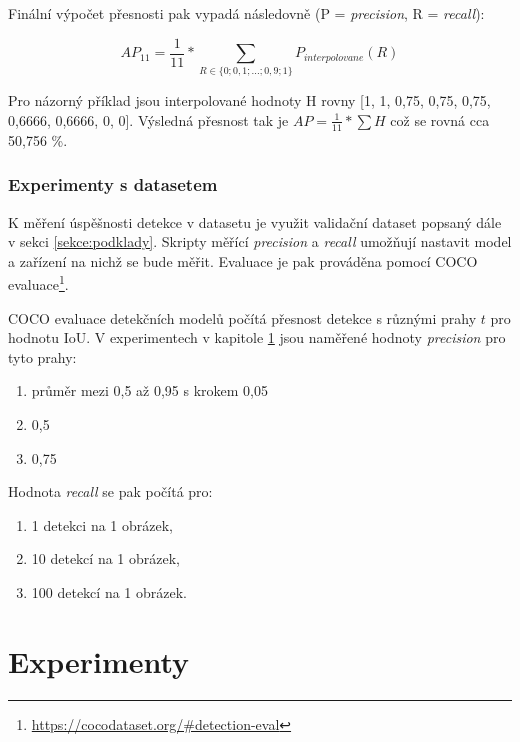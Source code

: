 \noindent Finální výpočet přesnosti pak vypadá následovně \cite{interpolace, detekceMetriky} (P = \emph{precision}, R = \emph{recall}):

\begin{equation}
  AP_{11} = \frac{1}{11} * \sum_{R \in \{0;0,1;...;0,9;1\}} P_{interpolovane} (R)
\end{equation}

Pro názorný příklad jsou interpolované hodnoty H rovny [1, 1, 0,75, 0,75, 0,75, 0,6666, 0,6666, 0, 0]. Výsledná přesnost tak je $AP = \frac{1}{11} * \sum H$ což se rovná cca 50,756 \%.

\subsection*{Experimenty s datasetem}
K měření úspěšnosti detekce v datasetu je využit validační dataset popsaný dále v sekci \ref{sekce:podklady}. Skripty měřící \emph{precision} a \emph{recall} umožňují nastavit model a zařízení na nichž se bude měřit. Evaluace je pak prováděna pomocí COCO evaluace\footnote{\url{https://cocodataset.org/\#detection-eval}}. 

COCO evaluace detekčních modelů počítá přesnost detekce s různými prahy $t$ pro hodnotu IoU. V experimentech v kapitole \ref{kapitola:experimenty} jsou naměřené hodnoty \emph{precision} pro tyto prahy:

\begin{enumerate}
  \item průměr mezi 0,5 až 0,95 s krokem 0,05
  \item 0,5
  \item 0,75
\end{enumerate}

\noindent Hodnota \emph{recall} se pak počítá pro:

\begin{enumerate}
  \item 1 detekci na 1 obrázek,
  \item 10 detekcí na 1 obrázek,
  \item 100 detekcí na 1 obrázek.
\end{enumerate}
 

\chapter{Experimenty}
\label{kapitola:experimenty}


